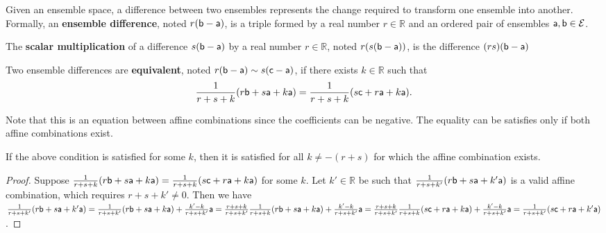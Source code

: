 \begin{mathSection}
	
	\begin{defn}
		Given an ensemble space, a difference between two ensembles represents the change required to transform one ensemble into another. Formally, an \textbf{ensemble difference}, noted $r(\ens[b] - \ens[a])$, is a triple formed by a real number $r \in \mathbb{R}$ and an ordered pair of ensembles $\ens[a],\ens[b] \in \Ens$.
	\end{defn}
	
	\begin{defn}
		The \textbf{scalar multiplication} of a difference $s(\ens[b] - \ens[a])$ by a real number $r \in \mathbb{R}$, noted $r(s(\ens[b] - \ens[a]))$, is the difference $(rs)(\ens[b] - \ens[a])$
	\end{defn}
	
	\begin{defn}
		Two ensemble differences are \textbf{equivalent}, noted $r(\ens[b] - \ens[a]) \sim s(\ens[c] - \ens[a])$, if there exists $k \in \mathbb{R}$ such that
		$$ \frac{1}{r+s+k} (r \ens[b] + s \ens[a] + k \ens[a]) = \frac{1}{r+s+k} (s \ens[c] + r \ens[a] + k \ens[a]).$$
	\end{defn}
	
	\begin{remark}
		Note that this is an equation between affine combinations since the coefficients can be negative. The equality can be satisfies only if both affine combinations exist.
	\end{remark}
	
	\begin{coro}
		If the above condition is satisfied for some $k$, then it is satisfied for all $k \neq -(r+s)$ for which the affine combination exists.
	\end{coro}
	
	\begin{proof}
		Suppose $\frac{1}{r+s+k} (r \ens[b] + s \ens[a] + k \ens[a]) = \frac{1}{r+s+k} (s \ens[c] + r \ens[a] + k \ens[a])$ for some $k$. Let $k' \in \mathbb{R}$ be such that $\frac{1}{r+s+k'} (r \ens[b] + s \ens[a] + k' \ens[a])$ is a valid affine combination, which requires $r+s+k'\neq0$. Then we have $\frac{1}{r+s+k'} (r \ens[b] + s \ens[a] + k' \ens[a]) = \frac{1}{r+s+k'} (r \ens[b] + s \ens[a] + k \ens[a]) + \frac{k'-k}{r+s+k'} \ens[a] = \frac{r+s+k}{r+s+k'} \frac{1}{r+s+k}(r \ens[b] + s \ens[a] + k \ens[a]) + \frac{k'-k}{r+s+k'} \ens[a] = \frac{r+s+k}{r+s+k'} \frac{1}{r+s+k}(s \ens[c] + r \ens[a] + k \ens[a]) + \frac{k'-k}{r+s+k'} \ens[a] = \frac{1}{r+s+k'} (s \ens[c] + r \ens[a] + k' \ens[a])$.
	\end{proof}
	

\end{mathSection}
